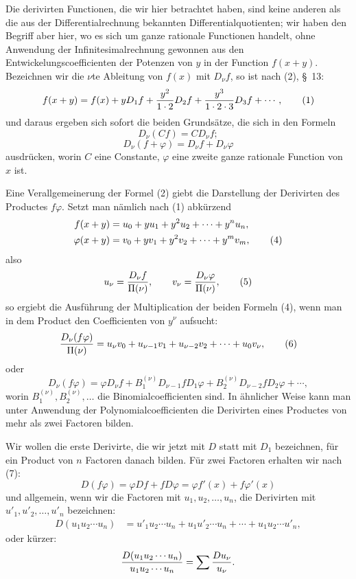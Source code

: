 \documentclass[11pt]{article}
\begin{document}
Die derivirten Functionen, die wir hier betrachtet haben, sind keine anderen als die aus der Differentialrechnung bekannten Differentialquotienten; wir haben den Begriff aber hier, wo es sich um ganze rationale Functionen handelt, ohne Anwendung der Infinitesimalrechnung gewonnen aus den Entwickelungscoefficienten der Potenzen von $y$ in der Function $f(x+y)$. Bezeichnen wir die $\nu$te Ableitung von $f(x)$ mit $D_\nu f$, so ist nach (2), \S~13:
\begin{equation}
 f(x+y)=f(x)+yD_1f+{y^2\over1\cdot2}D_2f+{y^3\over1\cdot2\cdot3}D_3f+\cdots,
\tag{1}
\end{equation}
und daraus ergeben sich sofort die beiden Grundsätze, die sich in den Formeln
\begin{equation}
 D_\nu(Cf)=C D_\nu f;
\tag{2}
\end{equation}
\begin{equation}
 D_\nu(f+\varphi)=D_\nu f+D_\nu\varphi
\tag{3}
\end{equation}
ausdrücken, worin $C$ eine Constante, $\varphi$ eine zweite ganze rationale Function von $x$ ist.

Eine Verallgemeinerung der Formel (2) giebt die Darstellung der Derivirten des Productes $f\varphi$. Setzt man nämlich nach (1) abkürzend
\begin{align}
 f(x+y)&=u_0+yu_1+y^2u_2+\cdots+y^nu_n,\notag\\
 \varphi(x+y)&=v_0+yv_1+y^2v_2+\cdots+y^mv_m,
\tag{4}
\end{align}
also
\begin{equation}
 u_\nu={D_\nu f\over\Pi(\nu)},\qquad
 v_\nu={D_\nu\varphi\over\Pi(\nu)},
\tag{5}
\end{equation}
so ergiebt die Ausführung der Multiplication der beiden Formeln (4), wenn man in dem Product den Coefficienten von $y^\nu$ aufsucht:
\begin{equation}
 {D_\nu(f\varphi)\over\Pi(\nu)}
 =u_\nu v_0+u_{\nu-1}v_1+u_{\nu-2}v_2+\cdots+u_0v_\nu,
\tag{6}
\end{equation}
oder
\begin{equation}
 D_\nu(f\varphi)=\varphi D_\nu f+B_1^{(\nu)}D_{\nu-1}fD_1\varphi
 +B_2^{(\nu)}D_{\nu-2}fD_2\varphi+\cdots,
\tag{7}
\end{equation}
worin $B_1^{(\nu)},B_2^{(\nu)},\ldots$ die Binomialcoefficienten sind. In ähnlicher Weise kann man unter Anwendung der Polynomialcoefficienten die Derivirten eines Productes von mehr als zwei Factoren bilden.

Wir wollen die erste Derivirte, die wir jetzt mit $D$ statt mit $D_1$ bezeichnen, für ein Product von $n$ Factoren danach bilden. Für zwei Factoren erhalten wir nach (7):
\[
 D(f\varphi)=\varphi Df+fD\varphi=\varphi f'(x)+f\varphi'(x)
\]
und allgemein, wenn wir die Factoren mit $u_1,u_2,\ldots,u_n$, die Derivirten mit $u'_1,u'_2,\ldots,u'_n$ bezeichnen:
\begin{equation}
\begin{aligned}
D(u_1u_2\cdots u_n)
&=u'_1u_2\cdots u_n+u_1u'_2\cdots u_n+\cdots+u_1u_2\cdots u'_n,
\end{aligned}
\tag{8}
\end{equation}
oder kürzer:
\[
 {D(u_1u_2\cdots u_n)\over u_1u_2\cdots u_n}
 =\sum {D u_\nu\over u_\nu}.
\]
\end{document}
